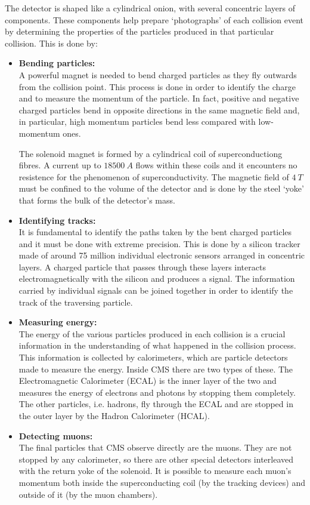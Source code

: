 The detector is shaped like a cylindrical onion, with several concentric layers of components. These components help prepare `photographs' of each collision event by determining the properties of the particles produced in that particular collision. This is done by:
\begin{itemize}
	\item \textbf{Bending particles:}\\
	A powerful magnet is needed to bend charged particles as they fly outwards from the collision point. This process is done in order to identify the charge and to measure the momentum of the particle. In fact, positive and negative charged particles bend in opposite directions in the same magnetic field and, in particular, high momentum particles bend less compared with low-momentum ones.
	
	The solenoid magnet is formed by a cylindrical coil of superconductiong fibres. A current up to $18500~\si{A}$ flows within these coils and it encounters no resistence for the phenomenon of superconductivity. The magnetic field of $4~\si{T}$ must be confined to the volume of the detector and is done by the steel `yoke' that forms the bulk of the detector's mass.
	
	\item \textbf{Identifying tracks:}\\
	It is fundamental to identify the paths taken by the bent charged particles and it must be done with extreme precision. This is done by a silicon tracker made of around 75 million individual electronic sensors arranged in concentric layers. A charged particle that passes through these layers interacts electromagnetically with the silicon and produces a signal. The information carried by individual signals can be joined together in order to identify the track of the traversing particle.
	
	\item \textbf{Measuring energy:}\\
	The energy of the various particles produced in each collision is a crucial information in the understanding of what happened in the collision process. This information is collected by calorimeters, which are particle detectors made to measure the energy. Inside CMS there are two types of these. The Electromagnetic Calorimeter (ECAL) is the inner layer of the two and measures the energy of electrons and photons by stopping them completely. The other particles, i.e. hadrons, fly through the ECAL and are stopped in the outer layer by the Hadron Calorimeter (HCAL).
	
	\item \textbf{Detecting muons:}\\
	The final particles that CMS observe directly are the muons. They are not stopped by any calorimeter, so there are other special detectors interleaved with the return yoke of the solenoid. It is possible to measure each muon's momentum both inside the superconducting coil (by the tracking devices) and outside of it (by the muon chambers).
\end{itemize}

